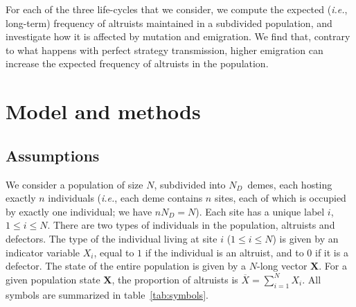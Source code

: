 \documentclass[11pt, letterpaper]{article}
\newcommand{\ie}{\textit{i.e.}}
\newcommand{\ndemes}{N_D}
\begin{document}
For each of the three life-cycles that we consider, we compute the expected (\ie, long-term) frequency of altruists maintained in a subdivided population, and investigate how it is affected by mutation and emigration. We find that, contrary to what happens with perfect strategy transmission, higher emigration can increase the expected frequency of altruists in the population. 




\section{Model and methods}

\subsection{Assumptions}

We consider a population of size $N$, subdivided into $\ndemes$~demes, each hosting exactly $n$ individuals (\ie, each deme contains $n$ sites, each of which is occupied by exactly one individual; we have $n \ndemes = N$). Each site has a unique label $i$, $1\leq i \leq N$. There are two types of individuals in the population, altruists and defectors. The type of the individual living at site $i$ ($1\leq i \leq N$) is given by an indicator variable $X_i$, equal to $1$ if the individual is an altruist, and to $0$ if it is a defector. The state of the entire population is given by a $N$-long vector $\mathbf{X}$. For a given population state $\mathbf{X}$, the proportion of altruists is $\overline{X} = \sum_{i=1}^N X_i$. All symbols are summarized in table~\ref{tab:symbols}.
\end{document}
